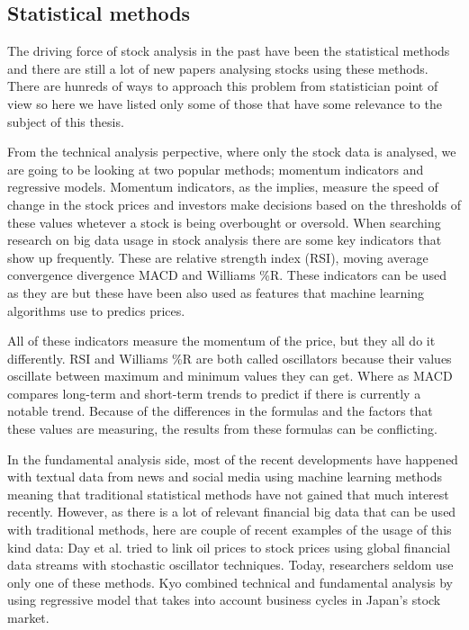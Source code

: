 \subsection{Statistical methods}

The driving force of stock analysis in the past have been the statistical methods and there are still a lot of new papers analysing stocks using these methods.
There are hunreds of ways to approach this problem from statistician point of view so here we have listed only some of those that have some relevance to the subject of this thesis.

From the technical analysis perpective, where only the stock data is analysed, we are going to be looking at two popular methods; momentum indicators and regressive models. \cite{utthammajai}
Momentum indicators, as the implies, measure the speed of change in the stock prices and investors make decisions based on the thresholds of these values whetever a stock is being overbought or oversold. \cite{james}
When searching research on big data usage in stock analysis there are some key indicators that show up frequently.
These are relative strength index (RSI), moving average convergence divergence MACD and Williams \%R.
These indicators can be used as they are but these have been also used as features that machine learning algorithms use to predics prices. \cite{serez}

All of these indicators measure the momentum of the price, but they all do it differently.
RSI and Williams \%R are both called oscillators because their values oscillate between maximum and minimum values they can get.
Where as MACD compares long-term and short-term trends to predict if there is currently a notable trend.
Because of the differences in the formulas and the factors that these values are measuring, the results from these formulas can be conflicting. \cite{james}

In the fundamental analysis side, most of the recent developments have happened with textual data from news and social media using machine learning methods meaning that traditional statistical methods have not gained that much interest recently.
However, as there is a lot of relevant financial big data that can be used with traditional methods, here are couple of recent examples of the usage of this kind data:
Day et al. \cite{day} tried to link oil prices to stock prices using global financial data streams with stochastic oscillator techniques.
Today, researchers seldom use only one of these methods.
Kyo \cite{kyo} combined technical and fundamental analysis by using regressive model that takes into account business cycles in Japan's stock market.

